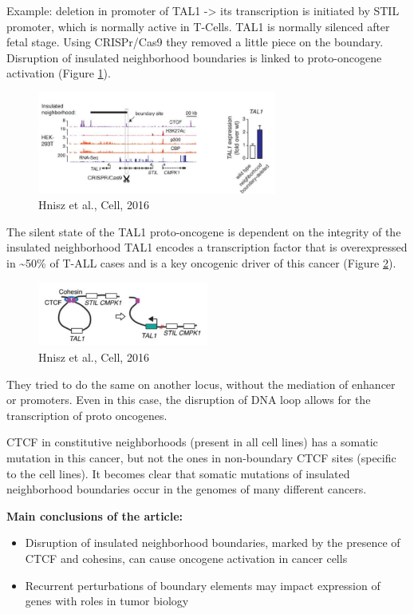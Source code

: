 Example: deletion in promoter of TAL1 -\textgreater{} its transcription is initiated by STIL promoter, which is normally active in T-Cells. TAL1 is normally silenced after fetal stage. Using CRISPr/Cas9 they removed a little piece on the boundary. Disruption of insulated neighborhood boundaries is linked to proto-oncogene activation (Figure \ref{fig:cas}).

\begin{figure}
\centering
\includegraphics[width=0.7\textwidth]{../_resources/bf32b9679af0fb7fcba57b9f87bb4207.png}
\caption{Hnisz et al., Cell, 2016}
\label{fig:cas}
\end{figure}


The silent state of the TAL1 proto-oncogene is dependent on the integrity of the insulated neighborhood TAL1 encodes a transcription factor that is overexpressed in \textasciitilde50\% of T-ALL cases and is a key oncogenic driver of this cancer (Figure \ref{fig:tal1}).

\begin{figure}
\centering
\includegraphics[width=0.5\textwidth]{../_resources/3d83d920d425aa5f76bdbb127596c02b.png}
\caption{Hnisz et al., Cell, 2016}
\label{fig:tal1}
\end{figure}

They tried to do the same on another locus, without the mediation of enhancer or promoters. Even in this case,  the disruption of DNA loop allows for the transcription of proto oncogenes.

CTCF in constitutive neighborhoods (present in all cell lines) has a somatic mutation in this cancer, but not the ones in non-boundary CTCF sites (specific to the cell lines). It becomes clear that somatic mutations of insulated neighborhood boundaries occur in the genomes of many different cancers.

\textbf{Main conclusions of the article:}
\begin{itemize}
\item Disruption of insulated neighborhood boundaries, marked by the presence of CTCF and cohesins,
can cause oncogene activation in cancer cells
\item Recurrent perturbations of boundary elements may impact expression of genes with roles in
tumor biology
\end{itemize}

